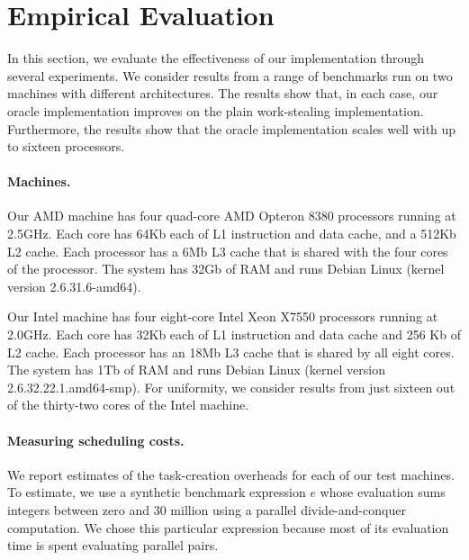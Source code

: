 
\section{Empirical Evaluation}
\label{sec:exp}
\label{sec:empirical-evaluation}

In this section, we evaluate the effectiveness of our implementation
through several experiments. We consider results from a range of
benchmarks run on two machines with different architectures. The
results show that, in each case, our oracle implementation improves on
the plain work-stealing implementation. Furthermore, the results show
that the oracle implementation scales well with up to sixteen processors.

\paragraph{Machines.}

Our AMD machine has four quad-core AMD Opteron 8380 processors running
at 2.5GHz.  Each core has 64Kb each of L1 instruction and data cache,
and a 512Kb L2 cache. Each processor has a 6Mb L3 cache that is shared
with the four cores of the processor.  The system has 32Gb of RAM and
runs Debian Linux (kernel version 2.6.31.6-amd64).

Our Intel machine has four eight-core Intel Xeon X7550 processors
running at 2.0GHz. Each core has 32Kb each of L1 instruction and
data cache and 256 Kb of L2 cache. Each processor has an 18Mb L3 cache
that is shared by all eight cores. The system has 1Tb of RAM and runs
Debian Linux (kernel version 2.6.32.22.1.amd64-smp).
For uniformity, we consider results from just sixteen out of the
thirty-two cores of the Intel machine. 


\paragraph{Measuring scheduling costs.}

We report estimates of the task-creation overheads for each of our test
machines. To estimate, we use a synthetic benchmark expression $e$
whose evaluation sums integers between zero and 30 million using a
parallel divide-and-conquer computation. We chose this particular
expression because most of its evaluation time is spent evaluating
parallel pairs. 

